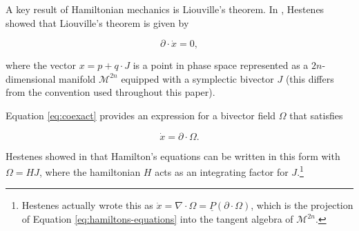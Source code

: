 \documentclass[twocolumn]{article}
\begin{document}
A key result of Hamiltonian mechanics is Liouville's theorem. In \cite{hestenes-hamilton}, Hestenes showed that Liouville's theorem is given by

\begin{equation}
  \partial \cdot \dot x = 0,\label{eq:hamilton-continuity}
\end{equation}

where the vector $x = p + q \cdot J$ is a point in phase space represented as a $2n$-dimensional manifold $\mathcal{M}^{2n}$ equipped with a symplectic bivector $J$ (this differs from the convention used throughout this paper).

Equation \ref{eq:coexact} provides an expression for a bivector field $\Omega$ that satisfies

\begin{equation}
  \dot x = \partial \cdot \Omega. \label{eq:hamiltons-equations}
\end{equation}

Hestenes showed in \cite{hestenes-hamilton} that Hamilton's equations can be written in this form with $\Omega = H J$, where the hamiltonian $H$ acts as an integrating factor for $J$.\footnote{Hestenes actually wrote this as $\dot x = \nabla \cdot \Omega = \underline P (\partial \cdot \Omega)$, which is the projection of Equation \ref{eq:hamiltons-equations} into the tangent algebra of $\mathcal{M}^{2n}$.}


\end{document}
